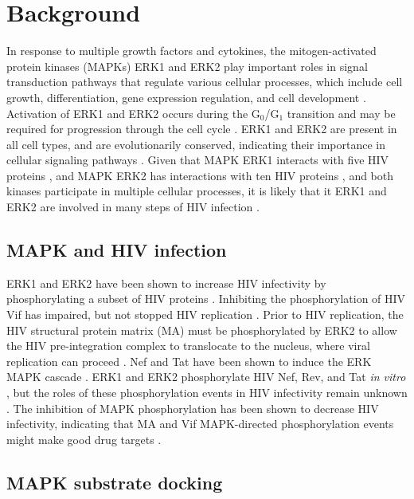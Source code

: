 \section{Background}

In response to multiple growth factors and cytokines, the
mitogen-activated protein kinases (MAPKs) ERK1 and ERK2 play important
roles in signal transduction pathways that regulate various cellular
processes, which include cell growth, differentiation, gene expression
regulation, and cell development
\cite{kolch2005coordinating,blenis1993signal}. Activation of ERK1 and
ERK2 occurs during the G$_0$/G$_1$ transition and may be required for
progression through the cell cycle
\cite{lavoie1996cyclin,roovers2000integrating}. ERK1 and ERK2 are
present in all cell types, and are evolutionarily conserved,
indicating their importance in cellular signaling pathways
\cite{sugden1997regulation,marshall1994map,robbins1994map}. Given that
MAPK ERK1 interacts with five HIV proteins \cite{fu09}, and MAPK ERK2
has interactions with ten HIV proteins \cite{kolch2005coordinating},
and both kinases participate in multiple cellular processes, it is
likely that it ERK1 and ERK2 are involved in many steps of HIV
infection \cite{ptak08}.

\subsection{MAPK and HIV infection}

ERK1 and ERK2 have been shown to increase HIV infectivity by
phosphorylating a subset of HIV proteins \cite{yang99}. Inhibiting the
phosphorylation of HIV Vif has impaired, but not stopped HIV
replication \cite{yang99, barraud08}. Prior to HIV replication, the
HIV structural protein matrix (MA) must be phosphorylated by ERK2 to
allow the HIV pre-integration complex to translocate to the nucleus,
where viral replication can proceed \cite{bukrinskaya96}. Nef and Tat
have been shown to induce the ERK MAPK cascade
\cite{toschi06,schrager02}. ERK1 and ERK2 phosphorylate HIV Nef, Rev,
and Tat \textit{in vitro} \cite{yang99}, but the roles of these
phosphorylation events in HIV infectivity remain unknown
\cite{yang98}. The inhibition of MAPK phosphorylation has been shown
to decrease HIV infectivity, indicating that MA and Vif MAPK-directed
phosphorylation events might make good drug targets
\cite{yang99,bukrinskaya96}.

\subsection{MAPK substrate docking} 

